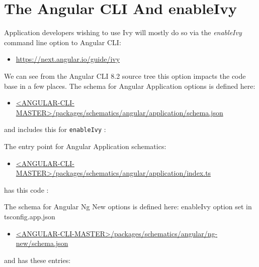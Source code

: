 \section{The Angular CLI And enableIvy}

Application developers wishing to use Ivy will mostly do so via the
\emph{enableIvy}
command line option to Angular CLI:

\begin{itemize}
  \item \url{https://next.angular.io/guide/ivy}
\end{itemize}

We can see from the Angular CLI 8.2 source tree this option impacts the code base in
a few places. The schema for Angular Application options is defined here:

\begin{itemize}
  \item \href{https://github.com/angular/angular-cli/blob/master/packages/schematics/angular/application/schema.json}
        {<ANGULAR-CLI-MASTER>/packages/schematics/angular/application/schema.json}
\end{itemize}

and includes this for
\texttt{enableIvy}
:



The entry point for Angular Application schematics:

\begin{itemize}
  \item \href{https://github.com/angular/angular-cli/blob/master/packages/schematics/angular/application/index.ts}
        {<ANGULAR-CLI-MASTER>/packages/schematics/angular/application/index.ts}
\end{itemize}

has this code :



The schema for Angular Ng New options is defined here:
enableIvy option set
in tsconfig.app.json

\begin{itemize}
  \item \href{https://github.com/angular/angular-cli/blob/master/packages/schematics/angular/ng-new/schema.json}
        {<ANGULAR-CLI-MASTER>/packages/schematics/angular/ng-new/schema.json}
\end{itemize}

and has these entries:

